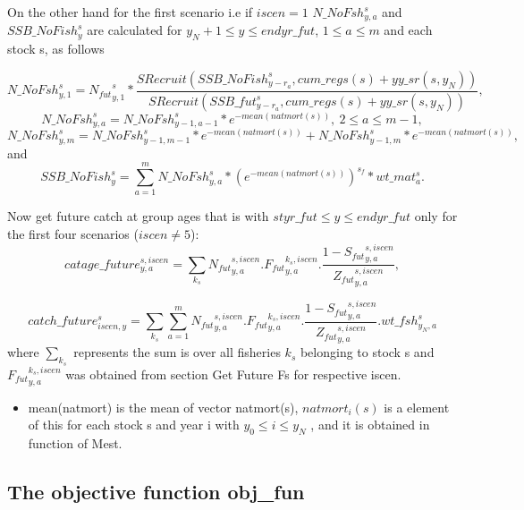 \documentclass{article}
\begin{document}
On the other hand for the first scenario i.e if $iscen=1$ $N\_NoFsh^s_{y,a}$ and $SSB\_NoFish^s_y$ are calculated for $y_N+1\leq y \leq endyr\_fut$, $1\leq a \leq m$ and each stock s, as follows

\begin{equation}
    N\_NoFsh^{s}_{y,1}={N_{fut}}^s_{y,1}*\dfrac{SRecruit(SSB\_NoFish^s_{y-r_a},cum\_regs(s)+yy\_sr(s,y_N))}{ SRecruit(SSB\_fut^s_{y-r_a},cum\_regs(s)+yy\_sr(s,y_N))},
\end{equation}
\begin{equation}
    N\_NoFsh^{s}_{y,a}=N\_NoFsh^s_{y-1,a-1}*e^{-mean(natmort(s))}, \ 2\leq a\leq m-1,
\end{equation}
\begin{equation}
    N\_NoFsh^s_{y,m}=N\_NoFsh^s_{y-1,m-1}*e^{-mean(natmort(s))}+N\_NoFsh^s_{y-1,m}*e^{-mean(natmort(s))},
\end{equation}
and
\begin{equation}
    SSB\_NoFish^s_y   = \sum_{a=1}^mN\_NoFsh^s_{y,a}*(e^{-mean(natmort(s))})^{s_f} * wt\_{mat}^s_a.
\end{equation}

Now get future catch at group ages that is with $styr\_fut \leq y \leq endyr\_fut$ only for the first four scenarios ($iscen\neq 5$):
\begin{equation}
    catage\_future^{s,iscen}_{y,a}=\sum_{k_s} {N_{fut}}^{s,iscen}_{y,a}.{F_{fut}}^{k_s, iscen}_{y,a}.\dfrac{1-{S_{fut}}^{s,iscen}_{y,a}}{{Z_{fut}}^{s,iscen}_{y,a}},
\end{equation}

\begin{equation}
    catch\_future^s_{iscen,y}=\sum_{k_s} \sum_{a=1}^m{N_{fut}}^{s,iscen}_{y,a}.{F_{fut}}^{k_s, iscen}_{y,a}.\dfrac{1-{S_{fut}}^{s,iscen}_{y,a}}{{Z_{fut}}^{s,iscen}_{y,a}}.wt\_fsh^s_{y_N,a}
\end{equation}
where $\displaystyle\sum_{k_s}$ represents the sum is over all fisheries $k_s$ belonging to stock s and ${F_{fut}}^{k_s, iscen}_{y,a}$ was obtained from section Get Future Fs for respective iscen.
\begin{itemize}
    \item mean(natmort) is the mean of vector natmort(s), $natmort_i(s) $ is a element of this for each stock s and year i with $y_0\leq i \leq y_N$ , and it is obtained in function of  Mest. 
\end{itemize}
\subsection{The objective function obj\_fun}
\end{document}
